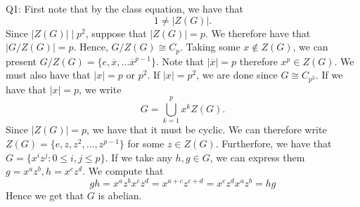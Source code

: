 \documentclass[letterpaper]{article}
\newcommand{\ol}{\overline}
\begin{document}
\noindent Q1: First note that by the class equation, we have that $$1 \neq |Z(G)|.$$ Since $|Z(G)| \mid p^2$, suppose that $|Z(G)| = p$. We therefore have that $|G / Z(G)| =p$. 
Hence, $G/Z(G) \cong C_p$. Taking some $x \notin Z(G)$, we can present $G/ Z(G) = \{e, \ol{x}, \dots \ol{x}^{p-1}\}.$ Note that $|\ol{x}| = p$ therefore $x^p \in Z(G).$ We must also have that $|x| = p$ or $p^2$. If $|x| = p^2$, we are done since $G \cong C_{p^2}.$ If we have that $|x| =p$, we write $$G = \bigcup_{k=1}^{p} x^k Z(G).$$
Since $|Z(G)| = p$, we have that it must be cyclic. We can therefore write $Z(G) = \{e,z,z^2 , \dots , z^{p-1}\}$ for some $z\in Z(G).$ Furtherfore, we have that $G = \{x^i z^j: 0\leq i,j\leq p\}.$ If we take any $h,g\in G$, we can express them $g = x^a z^b, h = x^c z^d$. We compute that $$gh = x^a z^b x^c z^d = x^{a+c}z^{c+d} = x^c z^d x^a z^b = hg$$
Hence we get that $G$ is abelian. 
\end{document}
